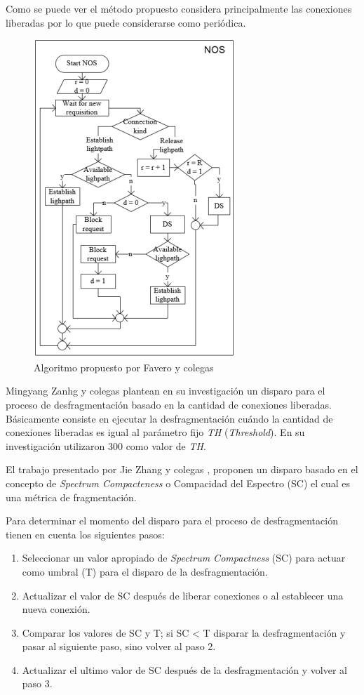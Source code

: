 Como se puede ver el método propuesto considera principalmente las conexiones liberadas por lo que puede considerarse como periódica.


\begin{figure}[h!]
    \centering
    \includegraphics{capitulos/img/disparoFavero}
    \caption{Algoritmo propuesto por Favero y colegas \cite{favero2015new}}
    \label{fig:favero}
\end{figure}

Mingyang Zanhg y colegas plantean en su investigación \cite{zhang2013bandwidth} un disparo para el proceso de desfragmentación basado en la cantidad de conexiones liberadas. Básicamente consiste en ejecutar la desfragmentación cuándo la cantidad de conexiones liberadas es igual al parámetro fijo \textit{TH} (\textit{Threshold}). En su investigación utilizaron 300 como valor de \textit{TH}.

El trabajo presentado por Jie Zhang y colegas \cite{zhang2012priority}, proponen un disparo basado en el concepto de \textit{Spectrum Compacteness} o Compacidad del Espectro (SC) el cual es una métrica de fragmentación.

Para determinar el momento del disparo para el proceso de desfragmentación tienen en cuenta los siguientes pasos:  
\begin{enumerate}[label=\arabic*)]
    \item Seleccionar un valor apropiado de \textit{Spectrum Compactness} (SC) para actuar como umbral (T) para el disparo de la desfragmentación.
    \item Actualizar el valor de SC después de liberar conexiones o al establecer una nueva conexión. 
    \item Comparar los valores de SC y T; si SC < T disparar la desfragmentación y pasar al siguiente paso, sino volver al paso 2.
    \item Actualizar el ultimo valor de SC después de la desfragmentación y volver al paso 3.
\end{enumerate}

